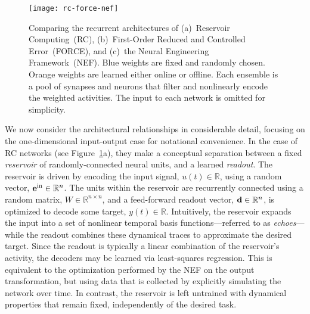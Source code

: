 \begin{figure}
  \centering
  \texttt{[image: rc-force-nef]}
  \caption[Architectural differences between FORCE, RC, and the NEF.]{ \label{fig:architectures}
    Comparing the recurrent architectures of (a)~Reservoir Computing~(RC), (b)~First-Order Reduced and Controlled Error~(FORCE), and (c)~the Neural Engineering Framework~(NEF).
    Blue weights are fixed and randomly chosen.
    Orange weights are learned either online or offline.
    Each ensemble is a pool of synapses and neurons that filter and nonlinearly encode the weighted activities.
    The input to each network is omitted for simplicity.
  }
\end{figure}


We now consider the architectural relationships in considerable detail, focusing on the one-dimensional input-output case for notational convenience.
In the case of RC networks (see Figure~\ref{fig:architectures}a), they make a conceptual separation between a fixed {\it reservoir} of randomly-connected neural units, and a learned {\it readout}.
The reservoir is driven by encoding the input signal, $u(t) \in \mathbb{R}$, using a random vector, $\mathbf{e}^\text{in} \in \mathbb{R}^n$.
The units within the reservoir are recurrently connected using a random matrix, $W \in \mathbb{R}^{n \times n}$,
and a feed-forward readout vector, $\mathbf{d} \in \mathbb{R}^{n}$, is optimized to decode some target, $y(t) \in \mathbb{R}$.
Intuitively, the reservoir expands the input into a set of nonlinear temporal basis functions---referred to as {\it echoes}---while the readout combines these dynamical traces to approximate the desired target.
Since the readout is typically a linear combination of the reservoir's activity, the decoders may be learned via least-squares regression.
This is equivalent to the optimization performed by the NEF on the output transformation, but using data that is collected by explicitly simulating the network over time.
In contrast, the reservoir is left untrained with dynamical properties that remain fixed, independently of the desired task.

